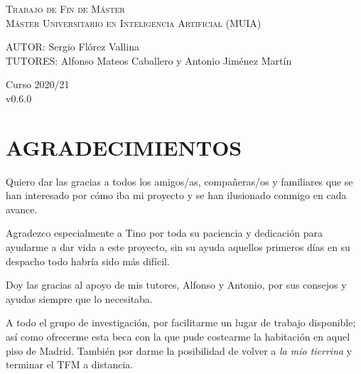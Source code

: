 \documentclass[spanish,12pt, a4paper,twoside]{article}
\let\oldsection\section
\def\section{\cleardoublepage\oldsection}
\newcommand\blankpage{
    \null
    \thispagestyle{empty}
    \addtocounter{page}{-1}
    \newpage
}
\begin{document}
\begin{titlepage}
        \textsc{\LARGE Trabajo de Fin de Máster}\\[0.5cm]
        \textsc{\large Máster Universitario en Inteligencia Artificial (MUIA) }\\[2.5cm]

        \begin{flushright}
            \large
            AUTOR: Sergio Flórez Vallina\\
            TUTORES: Alfonso Mateos Caballero y \linebreak
            Antonio Jiménez Martín
        \end{flushright}

        \vspace{1.3cm}

        { 
        	{Curso 2020/21}%
    	}\\[0.8cm]
    
        {
            {v0.6.0}
        }

                    

        \vfill

    \end{titlepage}

    \afterpage{\blankpage}


    \section*{AGRADECIMIENTOS}
    Quiero dar las gracias a todos los amigos/as, compañeras/os y familiares que se han interesado por cómo iba mi proyecto y se han ilusionado conmigo en cada avance. 
    
    Agradezco especialmente a Tino por toda su paciencia y dedicación para ayudarme
    a dar vida a este proyecto, sin su ayuda aquellos primeros días en su despacho todo habría sido más difícil. 
    
    Doy las gracias al apoyo de mis tutores, Alfonso y Antonio, por sus consejos y ayudas siempre que lo necesitaba.
    
    A todo el grupo de investigación, por facilitarme un lugar de trabajo disponible; así como ofrecerme esta beca con la que pude costearme la habitación en aquel piso de Madrid. También por darme la posibilidad de volver a \textit{la mio tierrina} y terminar el TFM a distancia.
    
\end{document}
